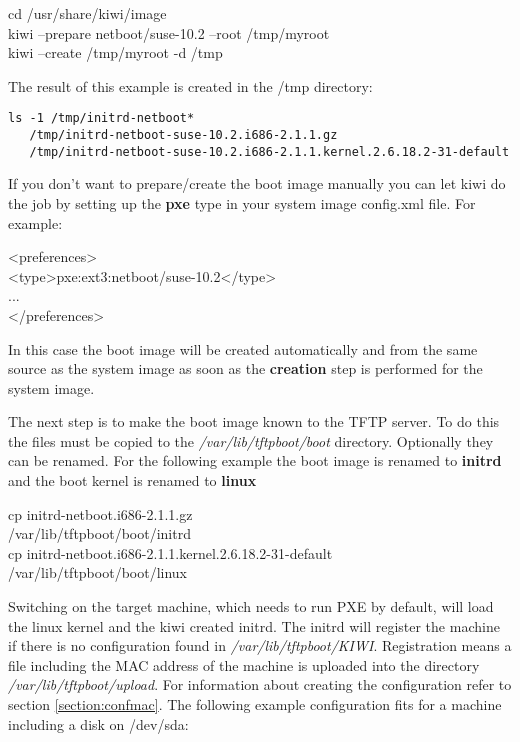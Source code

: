 \begin{Command}{13cm}
	cd /usr/share/kiwi/image\\
	kiwi --prepare netboot/suse-10.2 --root /tmp/myroot\\
	kiwi --create /tmp/myroot -d /tmp
\end{Command}

The result of this example is created in the /tmp directory:

\begin{verbatim}
ls -1 /tmp/initrd-netboot*
   /tmp/initrd-netboot-suse-10.2.i686-2.1.1.gz
   /tmp/initrd-netboot-suse-10.2.i686-2.1.1.kernel.2.6.18.2-31-default
\end{verbatim} 

If you don't want to prepare/create the boot image manually you
can let kiwi do the job by setting up the \textbf{pxe} type in your
system image config.xml file. For example:

\begin{Command}{12cm}
<preferences>\\
\hspace*{1cm}<type>pxe:ext3:netboot/suse-10.2</type>\\
\hspace*{1cm}...\\
</preferences>
\end{Command}

In this case the boot image will be created automatically and from
the same source as the system image as soon as the \textbf{creation}
step is performed for the system image.

The next step is to make the boot image known to the TFTP server.
To do this the files must be copied to the \textit{/var/lib/tftpboot/boot}
directory. Optionally they can be renamed. For the following
example the boot image is renamed to \textbf{initrd} and the boot kernel
is renamed to \textbf{linux}

\begin{Command}{13cm}
	cp initrd-netboot.i686-2.1.1.gz \bs \\
	\hspace*{2cm}/var/lib/tftpboot/boot/initrd\\
	cp initrd-netboot.i686-2.1.1.kernel.2.6.18.2-31-default \bs \\
	\hspace*{2cm}/var/lib/tftpboot/boot/linux\\
\end{Command}

Switching on the target machine, which needs to run PXE by default,
will load the linux kernel and the kiwi created initrd.
The initrd will register the machine if there is no configuration
found in \textit{/var/lib/tftpboot/KIWI}. Registration means a file
including the MAC address of the machine is uploaded into the directory
\textit{/var/lib/tftpboot/upload}. For information about creating the
configuration refer to section \ref{section:confmac}. The following
example configuration fits for a machine including a disk on /dev/sda:


